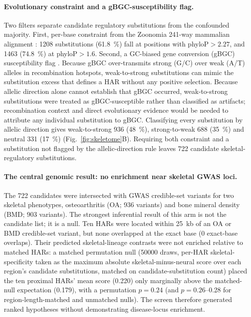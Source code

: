 \documentclass[11pt]{article}
\begin{document}
\paragraph{Evolutionary constraint and a gBGC-susceptibility flag.}
Two filters separate candidate regulatory substitutions from the confounded majority. First,
per-base constraint from the Zoonomia \num{241}-way mammalian alignment \citep{christmas2023zoonomia}:
\num{1208} substitutions (\SI{61.8}{\percent}) fall at positions with phyloP${}>\num{2.27}$, and
\num{1463} (\SI{74.8}{\percent}) at phyloP${}>\num{1.6}$. Second, a GC-biased gene conversion
(gBGC) susceptibility flag \citep{duret2009gbgc}. Because gBGC over-transmits strong (G/C) over
weak (A/T) alleles in recombination hotspots, weak-to-strong substitutions can mimic the
substitution excess that defines a HAR without any positive selection. Because allelic direction
alone cannot establish that gBGC occurred, weak-to-strong substitutions were treated as
gBGC-susceptible rather than classified as artifacts; recombination context and direct
evolutionary evidence would be needed to attribute any individual substitution to gBGC.
Classifying every substitution by allelic direction gives weak-to-strong \num{936}
(\SI{48}{\percent}), strong-to-weak \num{688} (\SI{35}{\percent}) and neutral \num{331}
(\SI{17}{\percent}) (Fig.~\ref{fig:skeletome}B). Requiring both constraint and a substitution not
flagged by the allelic-direction rule leaves \num{722} candidate skeletal-regulatory
substitutions.

\paragraph{The central genomic result: no enrichment near skeletal GWAS loci.}
The \num{722} candidates were intersected with GWAS credible-set variants for two skeletal
phenotypes, osteoarthritis (OA; \num{936} variants) and bone mineral density (BMD; \num{903}
variants). The strongest inferential result of this arm is not the candidate list; it is a null.
Ten HARs were located within \num{25}~kb of an OA or BMD credible-set variant, but none overlapped
at the exact base (\num{0} exact-base overlaps). Their predicted skeletal-lineage contrasts were
not enriched relative to matched HARs: a matched permutation null (\num{50000} draws, per-HAR
skeletal-specificity taken as the maximum absolute skeletal-minus-neural score over each region's
candidate substitutions, matched on candidate-substitution count) placed the ten proximal HARs'
mean score (\num{0.220}) only marginally above the matched-null expectation (\num{0.179}), with a
permutation $p=\num{0.24}$ (and $p=\num{0.26}$--\num{0.28} for region-length-matched and unmatched
nulls). The screen therefore generated ranked hypotheses without demonstrating disease-locus
enrichment.
\end{document}
